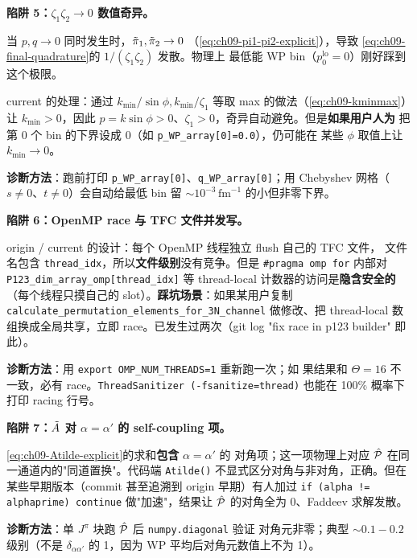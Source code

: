 \begin{pitfallbox}
\textbf{陷阱 5：\(\zeta_1\zeta_2 \to 0\) 数值奇异。}

当 \(p, q\to 0\) 同时发生时，\(\tilde{\pi}_{1}, \tilde{\pi}_{2}\to 0\)
（\eqref{eq:ch09-pi1-pi2-explicit}），导致
\eqref{eq:ch09-final-quadrature}的 \(1/(\zeta_1\zeta_2)\) 发散。物理上
最低能 WP bin（\(p_0^{\text{lo}}=0\)）刚好踩到这个极限。

current 的处理：通过 \(k_{\min}/\sin\phi, k_{\min}/\zeta_1\) 等取
max 的做法（\eqref{eq:ch09-kminmax}）让 \(k_{\min}>0\)，因此
\(p=k\sin\phi>0\)、\(\zeta_1>0\)，奇异自动避免。但是\textbf{如果用户人为}
把第 0 个 bin 的下界设成 0（如 \texttt{p\_WP\_array[0]=0.0}），仍可能在
某些 \(\phi\) 取值上让 \(k_{\min}\to 0\)。

\textbf{诊断方法}：跑前打印
\verb|p_WP_array[0]|、\verb|q_WP_array[0]|；用 Chebyshev 网格（
\(s\!\ne\!0\)、\(t\!\ne\!0\)）会自动给最低 bin 留 \(\sim
10^{-3}\,\mathrm{fm}^{-1}\) 的小但非零下界。
\end{pitfallbox}

\begin{pitfallbox}
\textbf{陷阱 6：OpenMP race 与 TFC 文件并发写。}

origin / current 的设计：每个 OpenMP 线程独立 flush 自己的 TFC 文件，
文件名包含 \texttt{thread\_idx}，所以\textbf{文件级别}没有竞争。但是
\texttt{\#pragma omp for} 内部对 \texttt{P123\_dim\_array\_omp[thread\_idx]}
等 thread-local 计数器的访问是\textbf{隐含安全的}（每个线程只摸自己的
slot）。\textbf{踩坑场景}：如果某用户复制 \texttt{calculate\_permutation\_elements\_for\_3N\_channel}
做修改、把 thread-local 数组换成全局共享，立即 race。已发生过两次（git
log "fix race in p123 builder" 即此）。

\textbf{诊断方法}：用 \texttt{export OMP\_NUM\_THREADS=1} 重新跑一次；如
果结果和 \(\Theta=16\) 不一致，必有 race。\texttt{ThreadSanitizer (-fsanitize=thread)}
也能在 100\% 概率下打印 racing 行号。
\end{pitfallbox}

\begin{pitfallbox}
\textbf{陷阱 7：\(\tilde{A}\) 对 \(\alpha=\alpha'\) 的 self-coupling 项。}

\eqref{eq:ch09-Atilde-explicit}的求和\textbf{包含} \(\alpha=\alpha'\) 的
对角项；这一项物理上对应 \(\hat{\mathcal{P}}\) 在同一通道内的"同道置换"。代码端
\texttt{Atilde()} 不显式区分对角与非对角，正确。但在某些早期版本（commit
甚至追溯到 origin 早期）有人加过 \verb|if (alpha != alphaprime) continue|
做"加速"，结果让 \(\hat{\mathcal{P}}\) 的对角全为 0、Faddeev 求解发散。

\textbf{诊断方法}：单 \(J^\pi\) 块跑 \(\hat{\mathcal{P}}\) 后 \texttt{numpy.diagonal} 验证
对角元非零；典型 \(\sim 0.1-0.2\) 级别（不是 \(\delta_{\alpha\alpha'}\)
的 1，因为 WP 平均后对角元数值上不为 1）。
\end{pitfallbox}

